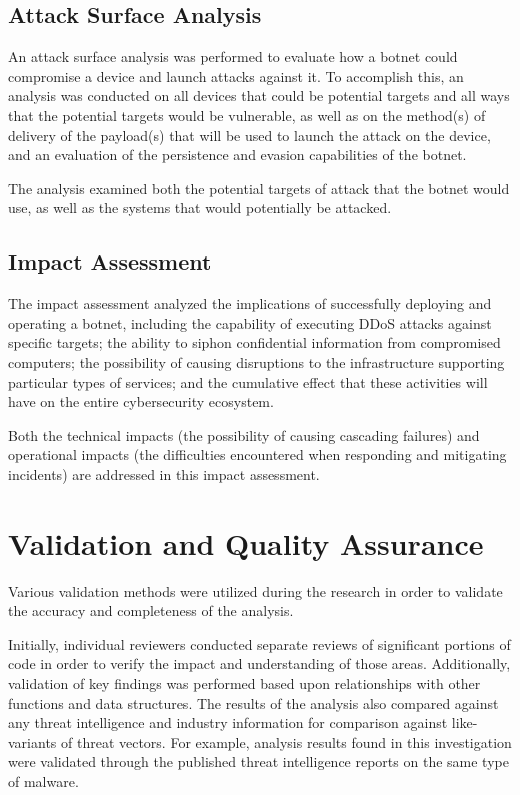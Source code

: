 \documentclass[12pt,letterpaper]{report}
\begin{document}
\subsection{Attack Surface Analysis}

An attack surface analysis was performed to evaluate how a botnet could compromise a device and launch attacks against it. To accomplish this, an analysis was conducted on all devices that could be potential targets and all ways that the potential targets would be vulnerable, as well as on the method(s) of delivery of the payload(s) that will be used to launch the attack on the device, and an evaluation of the persistence and evasion capabilities of the botnet.

The analysis examined both the potential targets of attack that the botnet would use, as well as the systems that would potentially be attacked.

\subsection{Impact Assessment}

The impact assessment analyzed the implications of successfully deploying and operating a botnet, including the capability of executing DDoS attacks against specific targets; the ability to siphon confidential information from compromised computers; the possibility of causing disruptions to the infrastructure supporting particular types of services; and the cumulative effect that these activities will have on the entire cybersecurity ecosystem.

Both the technical impacts (the possibility of causing cascading failures) and operational impacts (the difficulties encountered when responding and mitigating incidents) are addressed in this impact assessment.

\section{Validation and Quality Assurance}

Various validation methods were utilized during the research in order to validate the accuracy and completeness of the analysis.

Initially, individual reviewers conducted separate reviews of significant portions of code in order to verify the impact and understanding of those areas. Additionally, validation of key findings was performed based upon relationships with other functions and data structures. The results of the analysis also compared against any threat intelligence and industry information for comparison against like-variants of threat vectors. For example, analysis results found in this investigation were validated through the published threat intelligence reports on the same type of malware.
\end{document}

